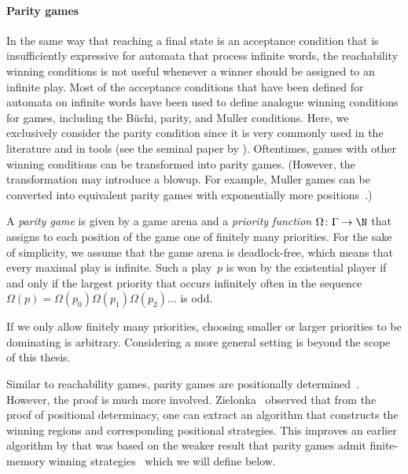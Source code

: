 \documentclass[../../diss.tex]{subfiles}
\begin{document}
\paragraph{Parity games}

In the same way that reaching a final state is an acceptance condition that is insufficiently expressive for automata that process infinite words, the reachability winning conditions is not useful whenever a winner should be assigned to an infinite play.
Most of the acceptance conditions that have been defined for automata on infinite words have been used to define analogue winning conditions for games, including the Büchi, parity, and Muller conditions.
Here, we exclusively consider the parity condition since it is very commonly used in the literature and in tools (see \eg the seminal paper by ).
Oftentimes, games with other winning conditions can be transformed into parity games.
(However, the transformation may introduce a blowup. For example, Muller games can be converted into equivalent parity games with exponentially more positions~\cite{DziembowskiJW97}.)

A \emph{parity game} is given by a game arena and a \emph{priority function} $\Omega \colon \configs \to \N$ that assigns to each position of the game one of finitely many priorities.
For the sake of simplicity, we assume that the game arena is deadlock-free, which means that every maximal play is infinite.
Such a play~$p$ is won by the existential player if and only if the largest priority that occurs infinitely often in the sequence $\Omega(p) = \Omega(p_0) \Omega(p_1) \Omega(p_2) \ldots$ is odd.

If we only allow finitely many priorities, choosing smaller or larger priorities to be dominating is arbitrary.
Considering a more general setting is beyond the scope of this thesis.

Similar to reachability games, parity games are positionally determined~\cite{Mostowski91,EmersonJ91}.
However, the proof is much more involved.
Zielonka~\cite{Zielonka98} observed that from the proof of positional determinacy, one can extract an algorithm that constructs the winning regions and corresponding positional strategies.
This improves an earlier algorithm by  that was based on the weaker result that parity games admit finite-memory winning strategies~\cite{GurevichH82} which we will define below.
\end{document}
